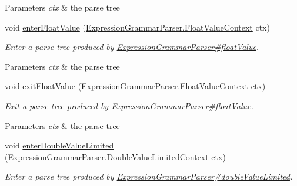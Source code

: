 \begin{DoxyCompactItemize}
\begin{DoxyCompactList}
\begin{DoxyParams}{Parameters}
{\em ctx} & the parse tree\\
\hline
\end{DoxyParams}
 \end{DoxyCompactList}\item 
void \hyperlink{classgov_1_1nasa_1_1jpf_1_1inspector_1_1server_1_1expression_1_1parser_1_1_expression_grammar_base_listener_a39cdb97485381da4a2467e1a9b0c9351}{enter\+Float\+Value} (\hyperlink{classgov_1_1nasa_1_1jpf_1_1inspector_1_1server_1_1expression_1_1parser_1_1_expression_grammar_parser_1_1_float_value_context}{Expression\+Grammar\+Parser.\+Float\+Value\+Context} ctx)
\begin{DoxyCompactList}\small\item\em Enter a parse tree produced by \hyperlink{classgov_1_1nasa_1_1jpf_1_1inspector_1_1server_1_1expression_1_1parser_1_1_expression_grammar_parser_a135341e27f8ab3d5000295c58d3b9df9}{Expression\+Grammar\+Parser\#float\+Value}.


\begin{DoxyParams}{Parameters}
{\em ctx} & the parse tree\\
\hline
\end{DoxyParams}
 \end{DoxyCompactList}\item 
void \hyperlink{classgov_1_1nasa_1_1jpf_1_1inspector_1_1server_1_1expression_1_1parser_1_1_expression_grammar_base_listener_a91fda7157a990954b9302b84cc35fc56}{exit\+Float\+Value} (\hyperlink{classgov_1_1nasa_1_1jpf_1_1inspector_1_1server_1_1expression_1_1parser_1_1_expression_grammar_parser_1_1_float_value_context}{Expression\+Grammar\+Parser.\+Float\+Value\+Context} ctx)
\begin{DoxyCompactList}\small\item\em Exit a parse tree produced by \hyperlink{classgov_1_1nasa_1_1jpf_1_1inspector_1_1server_1_1expression_1_1parser_1_1_expression_grammar_parser_a135341e27f8ab3d5000295c58d3b9df9}{Expression\+Grammar\+Parser\#float\+Value}.


\begin{DoxyParams}{Parameters}
{\em ctx} & the parse tree\\
\hline
\end{DoxyParams}
 \end{DoxyCompactList}\item 
void \hyperlink{classgov_1_1nasa_1_1jpf_1_1inspector_1_1server_1_1expression_1_1parser_1_1_expression_grammar_base_listener_a0dc87fa3d16977516e06888db8fed4e9}{enter\+Double\+Value\+Limited} (\hyperlink{classgov_1_1nasa_1_1jpf_1_1inspector_1_1server_1_1expression_1_1parser_1_1_expression_grammar_pa747378014be7c4ab66961e5db1be8d25}{Expression\+Grammar\+Parser.\+Double\+Value\+Limited\+Context} ctx)
\begin{DoxyCompactList}\small\item\em Enter a parse tree produced by \hyperlink{classgov_1_1nasa_1_1jpf_1_1inspector_1_1server_1_1expression_1_1parser_1_1_expression_grammar_parser_a57521cfe69d446d750563c91e30a034c}{Expression\+Grammar\+Parser\#double\+Value\+Limited}.



\end{DoxyCompactList}
\end{DoxyCompactItemize}
